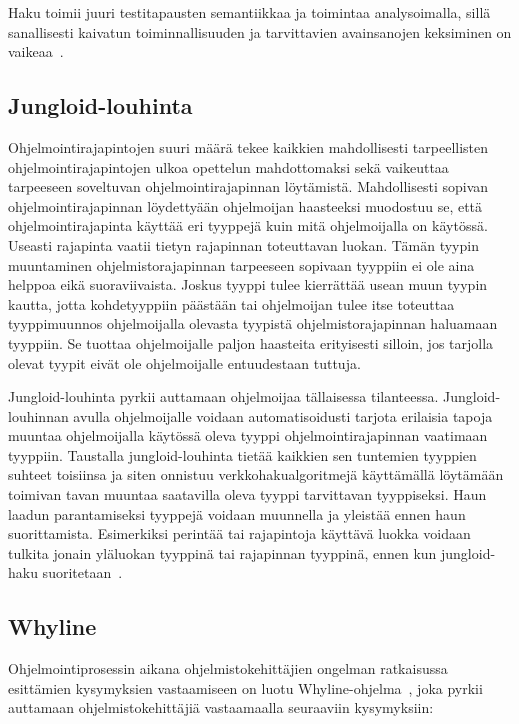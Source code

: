 \documentclass[finnish]{tktltiki2}
\theoremstyle{definition}
\theoremstyle{remark}
\begin{document}
Haku toimii juuri testitapausten semantiikkaa ja toimintaa analysoimalla, sillä sanallisesti kaivatun toiminnallisuuden ja tarvittavien avainsanojen keksiminen on vaikeaa~\cite{what-to-search-for}.

\subsection{Jungloid-louhinta}
\label{ch:jungloid}
Ohjelmointirajapintojen suuri määrä tekee kaikkien mahdollisesti tarpeellisten ohjelmointirajapintojen ulkoa opettelun mahdottomaksi sekä vaikeuttaa tarpeeseen soveltuvan ohjelmointirajapinnan löytämistä. Mahdollisesti sopivan ohjelmointirajapinnan löydettyään ohjelmoijan haasteeksi muodostuu se, että ohjelmointirajapinta käyttää eri tyyppejä kuin mitä ohjelmoijalla on käytössä. Useasti rajapinta vaatii tietyn rajapinnan toteuttavan luokan. Tämän tyypin muuntaminen ohjelmistorajapinnan tarpeeseen sopivaan tyyppiin ei ole aina helppoa eikä suoraviivaista. Joskus tyyppi tulee kierrättää usean muun tyypin kautta, jotta kohdetyyppiin päästään tai ohjelmoijan tulee itse toteuttaa tyyppimuunnos ohjelmoijalla olevasta tyypistä ohjelmistorajapinnan haluamaan tyyppiin. Se tuottaa ohjelmoijalle paljon haasteita erityisesti silloin, jos tarjolla olevat tyypit eivät ole ohjelmoijalle entuudestaan tuttuja.

Jungloid-louhinta pyrkii auttamaan ohjelmoijaa tällaisessa tilanteessa. Jungloid-louhinnan avulla ohjelmoijalle voidaan automatisoidusti tarjota erilaisia tapoja muuntaa ohjelmoijalla käytössä oleva tyyppi ohjelmointirajapinnan vaatimaan tyyppiin. Taustalla jungloid-louhinta tietää kaikkien sen tuntemien tyyppien suhteet toisiinsa ja siten onnistuu verkkohakualgoritmejä käyttämällä löytämään toimivan tavan muuntaa saatavilla oleva tyyppi tarvittavan tyyppiseksi. Haun laadun parantamiseksi tyyppejä voidaan muunnella ja yleistää ennen haun suorittamista. Esimerkiksi perintää tai rajapintoja käyttävä luokka voidaan tulkita jonain yläluokan tyyppinä tai rajapinnan tyyppinä, ennen kun jungloid-haku suoritetaan~\cite{jungloid-mining}.

\subsection{Whyline}
Ohjelmointiprosessin aikana ohjelmistokehittäjien ongelman ratkaisussa esittämien kysymyksien vastaamiseen on luotu Whyline-ohjelma~\cite{whyline}, joka pyrkii auttamaan ohjelmistokehittäjiä vastaamaalla seuraaviin kysymyksiin:
\end{document}
